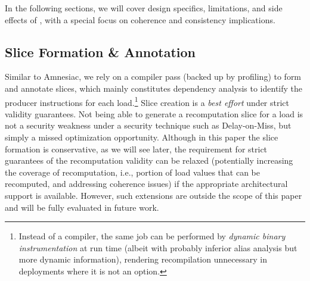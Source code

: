  In the following sections, we will cover design specifics, limitations, and side effects of \arch, with a special focus on coherence and consistency implications. 
 
 
\subsection{Slice Formation \& Annotation}
\label{sec:slice_formation}

Similar to Amnesiac, we rely on a compiler pass (backed up by profiling) to form and annotate slices, which 
 mainly constitutes
dependency analysis to
identify the producer instructions for each load.\footnote{Instead of a compiler,
the same job can be performed by \emph{dynamic binary instrumentation} at run time (albeit with probably inferior alias analysis but more dynamic information), rendering recompilation unnecessary in deployments where it is not an option.}
Slice creation is a \emph{best effort} under strict validity guarantees. Not being able to generate a recomputation slice for a load is not a security weakness under a security technique such as Delay-on-Miss, but simply a missed optimization opportunity.
 Although in this paper the slice formation is conservative, as we will see later, the requirement for strict guarantees of the recomputation validity can be relaxed (potentially increasing the coverage of recomputation, i.e., portion of load values that can be recomputed, and addressing coherence issues) if the appropriate architectural support is available. However, such extensions are outside the scope of this paper and will be fully evaluated in future work.

